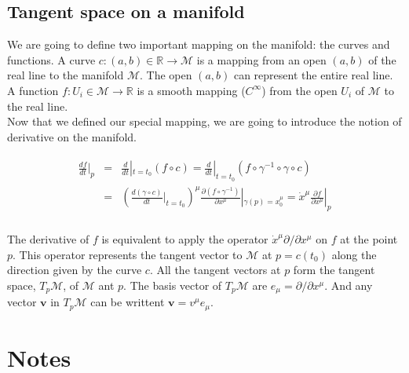 \documentclass[final, paper=letter,5p,times,twocolumn]{elsarticle}
\theoremstyle{definition}
\begin{document}
{\subsection{Tangent space on a manifold}

We are going to define two important mapping on the manifold: the curves and functions. A curve $c: (a,b) \in \mathbb{R} \rightarrow \mathcal{M}$ is a mapping from an open $(a,b)$ of the real line to the manifold $\mathcal{M}$. The open $(a,b)$ can represent the entire real line. A function $f: U_{i} \in \mathcal{M} \rightarrow \mathbb{R}$ is a smooth mapping ($C^{\infty}$) from the open $U_{i}$ of $\mathcal{M}$ to the real line.\\
Now that we defined our special mapping, we are going to introduce the notion of derivative on the manifold.

\begin{eqnarray*}
\begin{array}{rcl}
  \frac{df}{dt} |_{p} & = & \frac{d}{dt}|_{t = t_{0}} (f \circ c) = \frac{d}{dt}|_{t = t_{0}} (f \circ \gamma^{-1} \circ \gamma \circ c)\\
  & = &  \left(\frac{d(\gamma \circ c)}{dt}|_{t = t_{0}}\right)^{\mu}\frac{\partial (f \circ \gamma^{-1})}{\partial x^{\mu}}|_{\gamma(p) = x_{0}^{\mu}} = \dot{x}^{\mu}\frac{\partial f }{\partial x^{\mu}}|_{p}\\
\end{array}
\end{eqnarray*}

The derivative of $f$ is equivalent to apply the operator $\dot{x}^{\mu}\partial / \partial x^{\mu}$ on $f$ at the point $p$. This operator represents the tangent vector to $\mathcal{M}$ at $p = c(t_{0})$ along the direction given by the curve $c$. All the tangent vectors at $p$ form the tangent space, $T_{p}\mathcal{M}$, of $\mathcal{M}$ ant $p$. The basis vector of $T_{p}\mathcal{M}$ are $e_{\mu} = \partial / \partial x^{\mu}$. And any vector $\bm{v}$ in $T_{p}\mathcal{M}$ can be writtent $\bm{v} = v^{\mu} e_{\mu}$. \\


\section{Notes}

}
\end{document}
